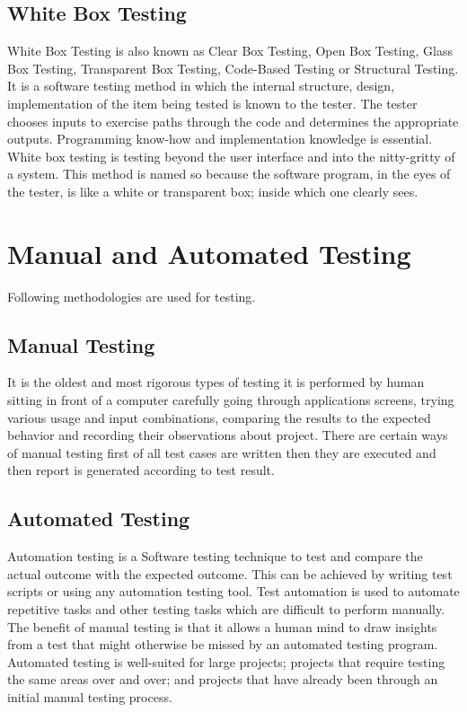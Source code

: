 \subsection{White Box Testing}
White Box Testing is also known as Clear Box Testing, Open Box Testing, Glass Box Testing,
Transparent Box Testing, Code-Based Testing or Structural Testing. It is a software testing
method in which the internal structure, design, implementation of the item being tested is
known to the tester. The tester chooses inputs to exercise paths through the code and determines the appropriate outputs. Programming know-how and implementation knowledge
is essential. White box testing is testing beyond the user interface and into the nitty-gritty
of a system.
This method is named so because the software program, in the eyes of the tester, is like
a white or transparent box; inside which one clearly sees.

\section {Manual and Automated Testing}
Following methodologies are used for testing.
\subsection{Manual Testing}
It is the oldest and most rigorous types of testing it is performed by human sitting in
front of a computer carefully going through applications screens, trying various usage and
input combinations, comparing the results to the expected behavior and recording their
observations about project. There are certain ways of manual testing first of all test cases
are written then they are executed and then report is generated according to test result.
\subsection{Automated Testing}
Automation testing is a Software testing technique to test and compare the actual outcome
with the expected outcome. This can be achieved by writing test scripts or using any
automation testing tool. Test automation is used to automate repetitive tasks and other
testing tasks which are difficult to perform manually.
The benefit of manual testing is that it allows a human mind to draw insights from a
test that might otherwise be missed by an automated testing program. Automated testing
is well-suited for large projects; projects that require testing the same areas over and over;
and projects that have already been through an initial manual testing process.

